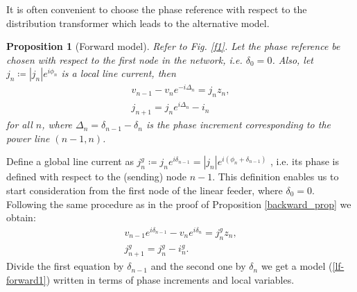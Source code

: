 \documentclass[journal,10pt,onecolumn,draftclsnofoot,]{IEEEtran}
\makeatletter
\theoremstyle{plain}
\newtheorem{proposition}{Proposition}
\theoremstyle{definition}
\theoremstyle{remark}
\renewenvironment{proof}[1][\proofname]{\par
  \pushQED{\qed}%
  \normalfont \topsep6\p@\@plus6\p@\relax
  \list{}{%
    \settowidth{\leftmargin}{\itshape\proofname:\hskip\labelsep}%
    \setlength{\labelwidth}{0pt}%
    \setlength{\itemindent}{-\leftmargin}%
  }%
  \item[\hskip\labelsep\itshape#1\@addpunct{:}]\ignorespaces
}{%
  \popQED\endlist\@endpefalse
}
\makeatother
\begin{document}
It is often convenient to choose the phase reference with respect to the distribution transformer which leads to the alternative model. 
\begin{proposition}[Forward model]
  Refer to Fig. \ref{f1}. Let the phase reference be chosen with respect to the first node in the network, i.e. $\delta_0 = 0$. Also, let $j_{n} \coloneqq |j_{n}|e^{i\phi_n}$ is a local line current, then
  \begin{equation}
    \begin{split}
    v_{n-1} - v_{n}e^{-i\Delta_{n}} = j_{n}z_{n}, \\
    j_{n+1} = j_{n}e^{i\Delta_{n}} - i_{n}
    \end{split}
    \label{lf-forward1}
  \end{equation}
  for all $n$, where $\Delta_{n} = \delta_{n-1} - \delta_{n}$ is the phase increment corresponding to the power line $(n-1, n)$. 
  \label{forward-prop}
\end{proposition}

\begin{proof}
  Define a global line current as $j^{g}_{n} \coloneqq j_{n}e^{i\delta_{n-1}} = |j_{n}|e^{i(\phi_n + \delta_{n-1})}$ , i.e. its phase is defined with respect to the (sending) node $n-1$. This definition enables us to start consideration from the first node of the linear feeder, where $\delta_0 = 0$. Following the same procedure as in the proof of Proposition \ref{backward_prop} we obtain:
  \begin{equation*}
    \begin{split}
    v_{n-1}e^{i\delta_{n-1}} - v_{n}e^{i\delta_n} = j^{g}_{n}z_{n}, \\
    j^{g}_{n+1} = j^{g}_{n} - i^g_{n}.
    \end{split}
  \end{equation*}
  Divide the first equation by $\delta_{n-1}$ and the second one by $\delta_{n}$ we get a model (\ref{lf-forward1}) written in terms of phase increments and local variables. 
\end{proof}
\end{document}

